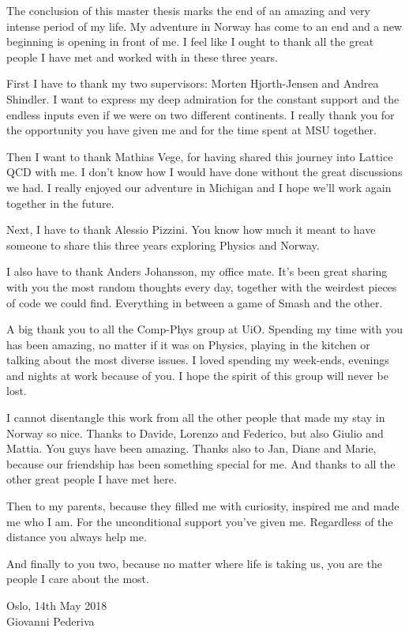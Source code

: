 The conclusion of this master thesis marks the end of an amazing and very intense period of my life. My adventure in Norway has come to an end and a new beginning is opening in front of me. I feel like I ought to thank all the great people I have met and worked with in these three years. 

First I have to thank my two supervisors: Morten Hjorth-Jensen and Andrea Shindler. I want to express my deep admiration for the constant support and the endless inputs even if we were on two different continents. I really thank you for the opportunity you have given me and for the time spent at MSU together.

Then I want to thank Mathias Vege, for having shared this journey into Lattice QCD with me. I don't know how I would have done without the great discussions we had. I really enjoyed our adventure in Michigan and I hope we'll work again together in the future.

Next, I have to thank Alessio Pizzini. You know how much it meant to have someone to share this three years exploring Physics and Norway. 

I also have to thank Anders Johansson, my office mate. It's been great sharing with you the most random thoughts every day, together with the weirdest pieces of code we could find. Everything in between a game of Smash and the other.

A big thank you to all the Comp-Phys group at UiO. Spending my time with you has been amazing, no matter if it was on Physics, playing in the kitchen or talking about the most diverse issues. I loved spending my week-ends, evenings and nights at work because of you. I hope the spirit of this group will never be lost.

I cannot disentangle this work from all the other people that made my stay in Norway so nice. Thanks to Davide, Lorenzo and Federico, but also Giulio and Mattia. You guys have been amazing. Thanks also to Jan, Diane and Marie, because our friendship has been something special for me. And thanks to all the other great people I have met here.

Then to my parents, because they filled me with curiosity, inspired me and made me who I am. For the unconditional support you've given me. Regardless of the distance you always help me.

And finally to you two, because no matter where life is taking us, you are the people I care about the most.

\vspace{2cm}
\begin{flushright}
    Oslo, 14th May 2018\\
    Giovanni Pederiva    
\end{flushright}




